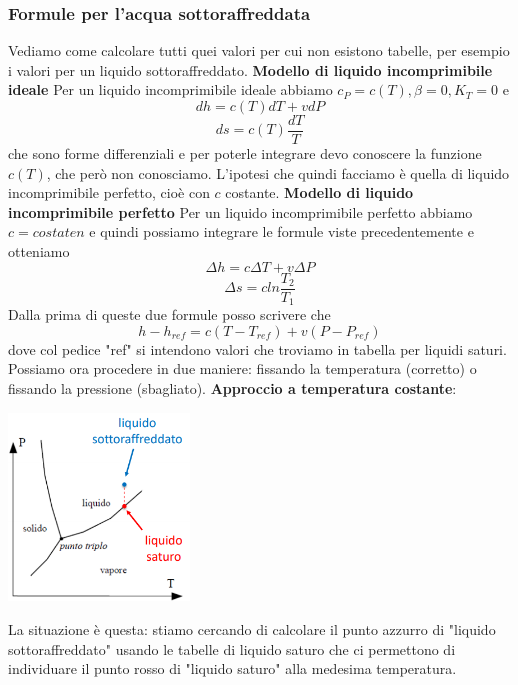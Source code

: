 \subsubsection{Formule per l'acqua sottoraffreddata}
Vediamo come calcolare tutti quei valori per cui non esistono tabelle, per esempio i valori per un liquido sottoraffreddato.\newline
\newline
\textbf{Modello di liquido incomprimibile ideale}\newline
Per un liquido incomprimibile ideale abbiamo $c_P = c(T), \beta = 0, K_T = 0$ e
\[
    dh = c(T) dT + v dP
\]
\[
    ds = c(T) \frac{dT}{T}
\]
che sono forme differenziali e per poterle integrare devo conoscere la funzione $c(T)$, che però non conosciamo. L'ipotesi che quindi facciamo è quella di liquido incomprimibile perfetto, cioè con $c$ costante.\newline
\newline
\textbf{Modello di liquido incomprimibile perfetto}\newline
Per un liquido incomprimibile perfetto abbiamo $c = costaten$ e quindi possiamo integrare le formule viste precedentemente e otteniamo
\[
    \Delta h = c\Delta T + v \Delta P
\]
\[
    \Delta s = c ln \frac{T_2}{T_1}
\]
Dalla prima di queste due formule posso scrivere che
\[
    h - h_{ref} = c(T-T_{ref}) + v (P-P_{ref})
\]
dove col pedice "ref" si intendono valori che troviamo in tabella per liquidi saturi.\newline
\newline
Possiamo ora procedere in due maniere: fissando la temperatura (corretto) o fissando la pressione (sbagliato).\newline
\newline
\textbf{Approccio a temperatura costante}:
\begin{center}
    \includegraphics[height=5cm]{../L04/img13.PNG}
\end{center}
La situazione è questa: stiamo cercando di calcolare il punto azzurro di "liquido sottoraffreddato" usando le tabelle di liquido saturo che ci permettono di individuare il punto rosso di "liquido saturo" alla medesima temperatura.
